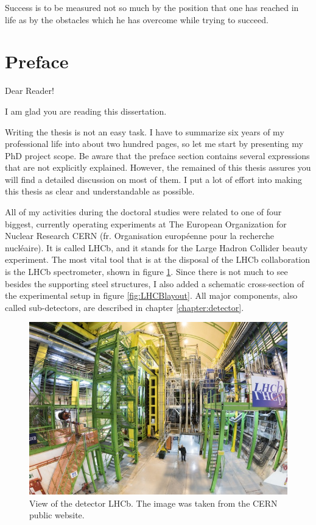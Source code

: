 \begin{savequote}[75mm] 
Success is to be measured not so much by the position that one has reached in life as by the obstacles which he has overcome while trying to succeed.
\end{savequote}



\chapter*{Preface}
\label{introduction}

Dear Reader! 

I am glad you are reading this dissertation.  

Writing the thesis is not an easy task. I have to summarize six years of my professional life into about two hundred pages, so let me start by presenting my PhD project scope.  Be aware that the preface section contains several expressions that are not explicitly explained. However, the remained of this thesis assures you will find a detailed discussion on most of them. I put a lot of effort into making this thesis as clear and understandable as possible. 

All of my activities during the doctoral studies were related to one of four biggest, currently operating experiments at The European Organization for Nuclear Research CERN (fr.  Organisation européenne pour la recherche nucléaire).  It is called LHCb, and it stands for the Large Hadron Collider beauty experiment. The most vital tool that is at the disposal of the LHCb collaboration is the LHCb spectrometer, shown in figure \ref{fig:LHCBphoto}. Since there is not much to see besides the supporting steel structures, I also added a schematic cross-section of the experimental setup in figure \ref{fig:LHCBlayout}. All major components, also called sub-detectors, are described in chapter \ref{chapter:detector}. 


\begin{figure}[!hb]
\centering
\includegraphics[width=\textwidth]{figures/LHCB_photo}
\caption{View of the detector LHCb. The image was taken from the CERN public website. 
\label{fig:LHCBphoto}}
\end{figure}

